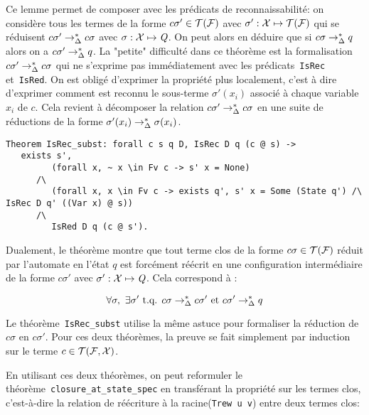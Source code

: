 Ce lemme permet de composer avec les prédicats de reconnaissabilité: on considère tous les termes de la forme $c\sigma' \in \mathcal{T(F)}$ avec $\sigma' :\mathcal X \mapsto \mathcal{T(F)}$ 
qui se réduisent $c\sigma' \rightarrow^*_\Delta c\sigma$ avec $\sigma :\mathcal X \mapsto \mathit Q$. On peut alors en déduire que si $c\sigma \rightarrow^*_\Delta q$
alors on a $c\sigma' \rightarrow^*_\Delta q$. La "petite" difficulté dans ce théorème est la formalisation $c\sigma' \rightarrow^*_\Delta c\sigma$ qui ne 
s'exprime pas immédiatement avec les prédicats~\lstinline!IsRec! et~\lstinline!IsRed!. On est obligé d'exprimer la propriété plus localement,
c'est à dire d'exprimer comment est reconnu le sous-terme $\sigma'(x_i)$ associé à chaque variable $x_i$ de $c$.
Cela revient à décomposer la relation $c\sigma' \rightarrow^*_\Delta c\sigma$ en une suite de réductions de la forme $\sigma'(x_i) \rightarrow^*_\Delta \sigma(x_i)$.


\begin{lstlisting}
Theorem IsRec_subst: forall c s q D, IsRec D q (c @ s) ->
   exists s', 
         (forall x, ~ x \in Fv c -> s' x = None)
      /\
         (forall x, x \in Fv c -> exists q', s' x = Some (State q') /\ IsRec D q' ((Var x) @ s))
      /\
         IsRed D q (c @ s').
\end{lstlisting}


Dualement, le théorème montre que tout terme clos de la forme $c\sigma \in \mathcal{T(F)}$ réduit par l'automate 
en l'état $q$ est forcément réécrit en une configuration intermédiaire de la forme $c\sigma'$ avec
$\sigma': \mathcal X \mapsto \mathit Q$. Cela correspond à :

\[\forall \sigma,\ \exists \sigma' \text{ t.q. } c\sigma \rightarrow^*_\Delta c\sigma' \text{ et } c\sigma' \rightarrow^*_\Delta q \]
  
Le théorème~\lstinline!IsRec_subst! utilise la même astuce pour formaliser la réduction de $c\sigma$ en $c\sigma'$.
Pour ces deux théorèmes, la preuve se fait simplement par induction sur le terme $c \in \mathcal{T(F, X)}$.


En utilisant ces deux théorèmes, on peut reformuler le théorème~\lstinline!closure_at_state_spec!
en transférant la propriété sur les termes clos, c'est-à-dire la relation de réécriture à la racine(\lstinline!Trew u v!)
entre deux termes clos:

